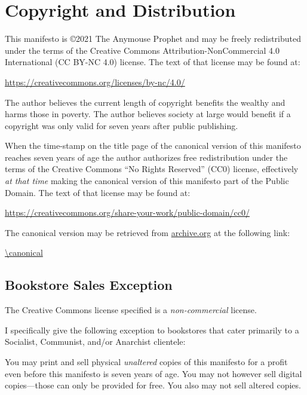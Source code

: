 \section{Copyright and Distribution}

This manifesto is \copyright 2021 The Anymouse Prophet and may be freely redistributed under the terms of the Creative Commons Attribution-NonCommercial 4.0 International (CC BY-NC 4.0) license. The text of that license may be found at:

\bigskip

\url{https://creativecommons.org/licenses/by-nc/4.0/}

\bigskip

\noindent The author believes the current length of copyright benefits the wealthy and harms those in poverty. The author believes society at large would benefit if a copyright was only valid for seven years after public publishing.

When the time-stamp on the title page of the canonical version of this manifesto reaches seven years of age the author authorizes free redistribution under the terms of the Creative Commons ``No Rights Reserved'' (CC0) license, effectively \emph{at that time} making the canonical version of this manifesto part of the Public Domain. The text of that license may be found at:

\bigskip

\url{https://creativecommons.org/share-your-work/public-domain/cc0/}

\bigskip

\noindent The canonical version may be retrieved from \url{archive.org} at the following link:

\bigskip

\url{\canonical}

\subsection{Bookstore Sales Exception}

The Creative Commons license specified is a \emph{non-commercial} license.

I specifically give the following exception to bookstores that cater primarily to a Socialist, Communist, and/or Anarchist clientele:

You may print and sell physical \emph{unaltered} copies of this manifesto for a profit even before this manifesto is seven years of age. You may not however sell digital copies---those can only be provided for free. You also may not sell altered copies.

